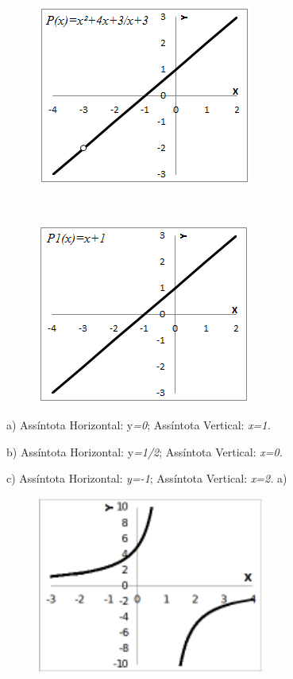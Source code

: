 \begin{respostas}{3}
	\begin{figure}[H]
		\begin{Center}
			\includegraphics[width=2.8in,height=2.31in]{capitulos/outras_funcoes/media/image55.png}
		\end{Center}
	\end{figure}

	~~

	\begin{figure}[H]
		\begin{Center}
			\includegraphics[width=2.77in,height=2.34in]{capitulos/outras_funcoes/media/image56.png}
		\end{Center}
	\end{figure}

	\ansitem{} a) Assíntota Horizontal: y\textit{=0}; Assíntota Vertical: \textit{x=1.}

	b) Assíntota Horizontal: y\textit{=1/2}; Assíntota Vertical: \textit{x=0.}

	c) Assíntota Horizontal: \textit{y=-1}; Assíntota Vertical: \textit{x=2.}
	\newpage
	\ansitem{} a) 

	\begin{figure}[H]
		\begin{Center}
			\includegraphics[width=2.96in,height=2.29in]{capitulos/outras_funcoes/media/image57.pdf}
		\end{Center}
	\end{figure}


\end{respostas}
